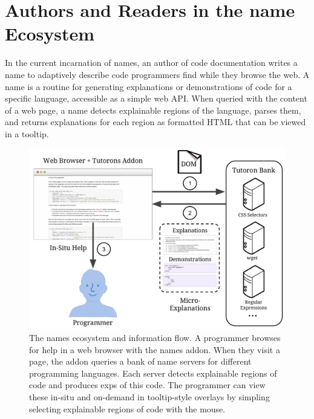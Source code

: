 \section{Authors and Readers in the \Gls{name} Ecosystem}

In the current incarnation of \glspl{name}, an author of code documentation writes a \gls{name} to adaptively describe  code programmers find while they browse the web.
A \gls{name} is a routine for generating explanations or demonstrations of code for a specific language, accessible as a simple web API\@.
When queried with the content of a web page, a \gls{name} detects explainable regions of the language, parses them, and returns explanations for each region as formatted HTML that can be viewed in a tooltip.

\begin{figure}
    \includegraphics[width=\columnwidth]{figures/tutoron_ecosystem}
    \caption{%
    The \glspl{name} ecosystem and information flow.
    A programmer browses for help in a web browser with the \Glspl{name} addon.
    When they visit a page, the addon queries a bank of \gls{name} servers for different programming languages.
    Each server detects explainable regions of code and produces \glspl{exp} of this code.
    The programmer can view these in-situ and on-demand in tooltip-style overlays by simpling selecting explainable regions of code with the mouse.
    }\label{fig:tutoron_ecosystem}
\end{figure}

